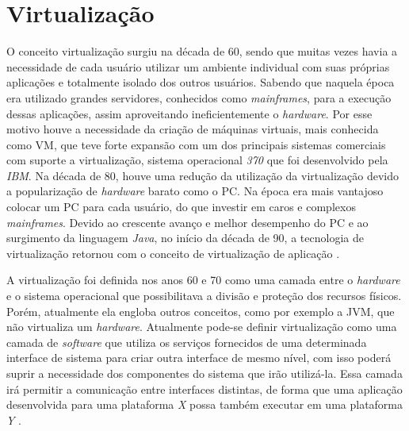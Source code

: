 \chapter{Virtualização}
\label{cap:virtualizacao}

O conceito virtualização surgiu na década de 60, sendo que muitas vezes havia a necessidade de cada usuário utilizar um ambiente individual 
com suas próprias aplicações e totalmente isolado dos outros usuários. Sabendo que naquela época era utilizado grandes servidores, conhecidos
como \textit{mainframes}, para a execução dessas aplicações, assim aproveitando ineficientemente o \textit{hardware}. Por esse motivo houve
a necessidade da criação de máquinas virtuais, mais conhecida como \ac{VM}, que teve forte expansão com um dos principais sistemas comerciais 
com suporte a virtualização, sistema operacional \textit{370} que foi desenvolvido pela \textit{IBM}. Na década de 80, houve uma redução da
utilização da virtualização devido a popularização de \textit{hardware} barato como o \ac{PC}. Na época era mais vantajoso colocar um \ac{PC} 
para cada usuário, do que investir em caros e complexos \textit{mainframes}. Devido ao crescente avanço e melhor desempenho do \ac{PC} e
ao surgimento da linguagem \textit{Java}, no início da década de 90, a tecnologia de virtualização retornou com o conceito de virtualização
de aplicação \cite{laureano2008}.

A virtualização foi definida nos anos 60 e 70 como uma camada entre o \textit{hardware} e o sistema operacional que possibilitava a 
divisão e proteção dos recursos físicos. Porém, atualmente ela engloba outros conceitos, como por exemplo a \ac{JVM}, que não virtualiza
um \textit{hardware}. Atualmente pode-se definir virtualização como uma camada de \textit{software} que utiliza os serviços fornecidos
de uma determinada interface de sistema para criar outra interface de mesmo nível, com isso poderá suprir a necessidade dos componentes do 
sistema que irão utilizá-la. Essa camada irá permitir a comunicação entre interfaces distintas, de forma que uma aplicação desenvolvida para
uma plataforma \textit{X} possa também executar em uma plataforma \textit{Y} \cite{laureano2008}.

